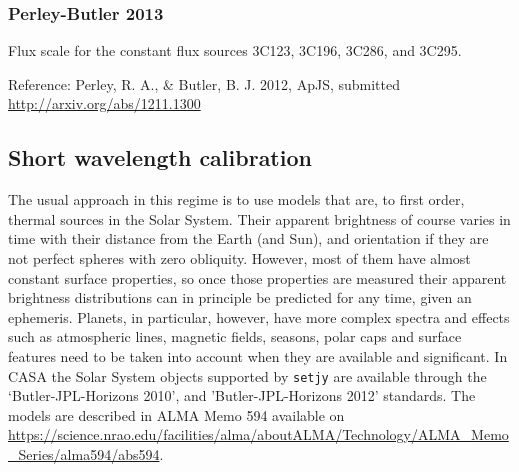  
\subsubsection{Perley-Butler 2013}
\label{section:conventions.longwavelength.perleybutler13}

Flux scale for the constant flux sources 3C123, 3C196, 3C286,
and 3C295.

Reference: Perley, R. A., \& Butler, B. J. 2012, ApJS, submitted\\
\url{http://arxiv.org/abs/1211.1300}



\subsection{Short wavelength calibration}
\label{section:conventions.shortwavelength}




The usual approach in this regime is to use models that are, to first
order, thermal sources in the Solar System. Their apparent brightness
of course varies in time with their distance from the Earth (and Sun),
and orientation if they are not perfect spheres with zero obliquity.
However, most of them have almost constant surface properties, so once
those properties are measured their apparent brightness distributions
can in principle be predicted for any time, given an
ephemeris. Planets, in particular, however, have more complex spectra
and effects such as atmospheric lines, magnetic fields, seasons, polar
caps and surface features need to be taken into account when they are
available and significant. In CASA the Solar System objects supported
by {\tt setjy} are available through the `Butler-JPL-Horizons 2010',
and 'Butler-JPL-Horizons 2012' standards. The models are described in ALMA
Memo 594 available on
\url{https://science.nrao.edu/facilities/alma/aboutALMA/Technology/ALMA_Memo_Series/alma594/abs594}.

